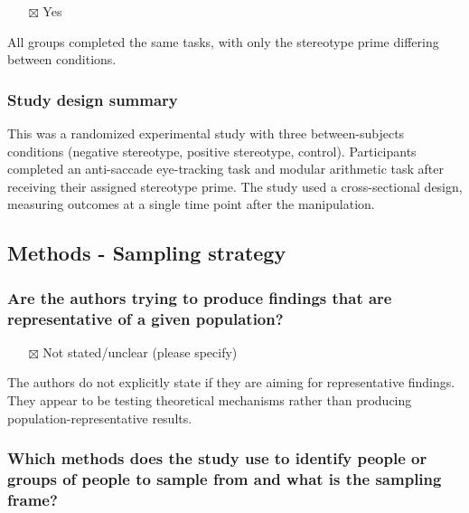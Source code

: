 \documentclass[
  doc, a4paper]{apa7}
\providecommand{\tightlist}{%
  \setlength{\itemsep}{0pt}\setlength{\parskip}{0pt}}
\begin{document}
\begin{itemize}
\tightlist
\item[$\boxtimes$]
  Yes
\end{itemize}

All groups completed the same tasks, with only the stereotype prime differing between conditions.

\subsubsection{Study design summary}\label{study-design-summary}

This was a randomized experimental study with three between-subjects conditions (negative stereotype, positive stereotype, control). Participants completed an anti-saccade eye-tracking task and modular arithmetic task after receiving their assigned stereotype prime. The study used a cross-sectional design, measuring outcomes at a single time point after the manipulation.

\subsection{Methods - Sampling strategy}\label{methods---sampling-strategy}

\subsubsection{Are the authors trying to produce findings that are representative of a given population?}\label{are-the-authors-trying-to-produce-findings-that-are-representative-of-a-given-population}

\begin{itemize}
\tightlist
\item[$\boxtimes$]
  Not stated/unclear (please specify)
\end{itemize}

The authors do not explicitly state if they are aiming for representative findings. They appear to be testing theoretical mechanisms rather than producing population-representative results.

\subsubsection{Which methods does the study use to identify people or groups of people to sample from and what is the sampling frame?}\label{which-methods-does-the-study-use-to-identify-people-or-groups-of-people-to-sample-from-and-what-is-the-sampling-frame}
\end{document}
